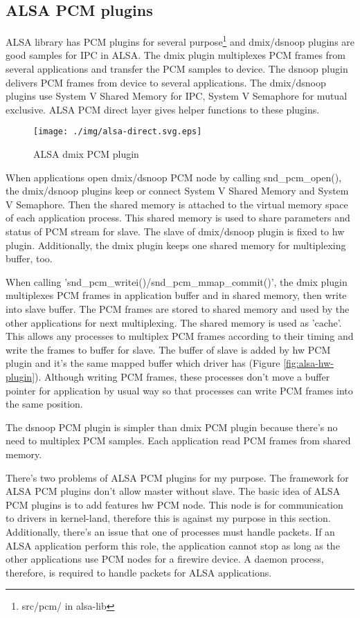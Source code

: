 \documentclass[onecolumn]{article}
\begin{document}
\subsection{ALSA PCM plugins}
ALSA library has PCM plugins for several purpose\footnote{src/pcm/ in alsa-lib} and dmix/dsnoop plugins are good samples for IPC in ALSA. The dmix plugin multiplexes PCM frames from several applications and transfer the PCM samples to device. The dsnoop plugin delivers PCM frames from device to several applications. The dmix/dsnoop plugins use System V Shared Memory for IPC, System V Semaphore for mutual exclusive. ALSA PCM direct layer gives helper functions to these plugins.

\begin{figure}[htbp]
	\centering
	\texttt{[image: ./img/alsa-direct.svg.eps]}
	\caption{ALSA dmix PCM plugin}
	\label{alsa_direct}
\end{figure}


When applications open dmix/dsnoop PCM node by calling snd\_pcm\_open(), the dmix/dsnoop plugins keep or connect System V Shared Memory and System V Semaphore. Then the shared memory is attached to the virtual memory space of each application process. This shared memory is used to share parameters and status of PCM stream for slave. The slave of dmix/dsnoop plugin is fixed to hw plugin. Additionally, the dmix plugin keeps one shared memory for multiplexing buffer, too.

When calling 'snd\_pcm\_writei()/snd\_pcm\_mmap\_commit()', the dmix plugin multiplexes PCM frames in application buffer and in shared memory, then write into slave buffer. The PCM frames are stored to shared memory and used by the other applications for next multiplexing. The shared memory is used as 'cache'. This allows any processes to multiplex PCM frames according to their timing and write the frames to buffer for slave. The buffer of slave is added by hw PCM plugin and it's the same mapped buffer which driver has (Figure \ref{fig:alsa-hw-plugin}). Although writing PCM frames, these processes don't move a buffer pointer for application by usual way so that processes can write PCM frames into the same position.

The dsnoop PCM plugin is simpler than dmix PCM plugin because there's no need to multiplex PCM samples. Each application read PCM frames from shared memory.

There's two problems of ALSA PCM plugins for my purpose. The framework for ALSA PCM plugins don't allow master without slave. The basic idea of ALSA PCM plugins is to add features hw PCM node. This node is for communication to drivers in kernel-land, therefore this is against my purpose in this section. Additionally, there's an issue that one of processes must handle packets. If an ALSA application perform this role, the application cannot stop as long as the other applications use PCM nodes for a firewire device. A daemon process, therefore, is required to handle packets for ALSA applications.
\end{document}
